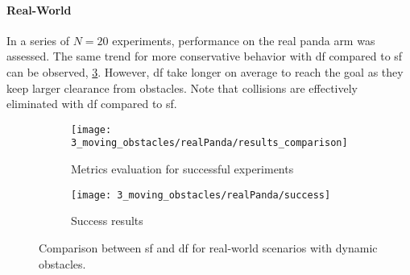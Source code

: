 \paragraph{Real-World}
In a series of $N=20$ experiments, performance on the real panda arm was assessed. The same
trend for more conservative behavior with \ac{df} compared to \ac{sf} can be observed,
\cref{fig:experiment3_realPanda}. However, \ac{df} take longer on average to reach the
goal as they keep larger clearance from obstacles. Note that collisions are effectively
eliminated with \ac{df} compared to \ac{sf}.

\begin{figure}[ht]
  \centering
  \begin{subfigure}{1.0\linewidth}
    \centering
    \texttt{[image: 3\_moving\_obstacles/realPanda/results\_comparison]}
    \caption{Metrics evaluation for successful experiments}%
    \label{subfig:experiment3_realPanda_res}
  \end{subfigure}
  \begin{subfigure}{1.0\linewidth}
    \centering
    \texttt{[image: 3\_moving\_obstacles/realPanda/success]}
    \caption{Success results}%
    \label{subfig:experiment3_realPanda_success}
  \end{subfigure}
  \caption{Comparison between \ac{sf} and \ac{df} for real-world scenarios with dynamic obstacles.
  }%
  \label{fig:experiment3_realPanda}
\end{figure}


